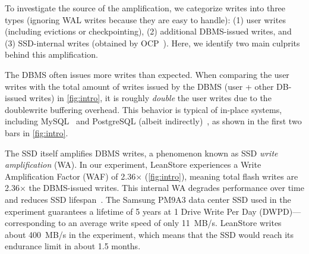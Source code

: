 To investigate the source of the amplification, we categorize writes into three types (ignoring WAL writes because they are easy to handle):
(1) user writes (including evictions or checkpointing),
(2) additional DBMS-issued writes, and
(3) SSD-internal writes (obtained by OCP~\cite{ocp}). 
Here, we identify two main culprits behind this amplification.

The DBMS often issues more writes than expected.
When comparing the user writes with the total amount of writes issued by the DBMS (user + other DB-issued writes) in \cref{fig:intro}, 
it is roughly \emph{double} the user writes due to the doublewrite buffering overhead.
This behavior is typical of in-place systems, including MySQL~\cite{mysql-dwb} and PostgreSQL (albeit indirectly)~\cite{postgresql/doc/dwb}, as shown in the first two bars in \cref{fig:intro}.

The SSD itself amplifies DBMS writes, a phenomenon known as SSD \emph{write amplification} (WA).
In our experiment, LeanStore experiences a Write Amplification Factor (WAF) of 2.36$\times$ (\cref{fig:intro}), meaning total flash writes are 2.36$\times$ the DBMS-issued writes.
This internal WA degrades performance over time and reduces SSD lifespan~\cite{lerner2024principles, arkiv/Dayan15}.
The Samsung PM9A3 data center SSD used in the experiment guarantees a lifetime of 5 years at 1 Drive Write Per Day (DWPD)---corresponding to an average write speed of only 11~MB/s.
LeanStore writes about 400~MB/s in the experiment, which means that the SSD would reach its endurance limit in about 1.5 months.

